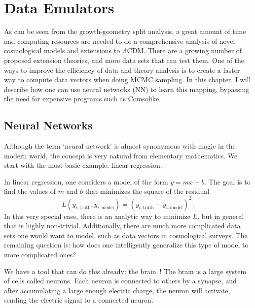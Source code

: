 \chapter{Data Emulators}
As can be seen from the growth-geometry split analysis, a great amount of time and computing resources are needed to do a comprehensive analysis of novel cosmological models and extensions to $\Lambda$CDM. There are a growing number of proposed extension theories, and more data sets that can test them. One of the ways to improve the efficiency of data and theory analysis is to create a faster way to compute data vectors when doing MCMC sampling. In this chapter, I will describe how one can use neural networks (NN) to learn this mapping, bypassing the need for expensive programs such as Comsolike.
\section{Neural Networks}
Although the term `neural network' is almost synonymous with magic in the modern world, the concept is very natural from elementary mathematics. We start with the most basic example: linear regression. 

In linear regression, one considers a model of the form $y=mx+b$. The goal is to find the values of $m$ and $b$ that minimizes the square of the residual
\begin{equation}
	L(y_{i,\mathrm{truth}},y_{i,\mathrm{model}}) = (y_{i,\mathrm{truth}} - y_{i,\mathrm{model}})^2\,.
\end{equation}
In this very special case, there is an analytic way to minimize $L$, but in general that is highly non-trivial. Additionally, there are much more complicated data sets one would want to model, such as data vectors in cosmological surveys. The remaining question is: how does one intelligently generalize this type of model to more complicated ones?

We have a tool that can do this already: the brain~\cite{noauthor_what_nodate}! The brain is a large system of cells called neurons. Each neuron is connected to others by a synapse, and after accumulating a large enough electric charge, the neuron will activate, sending the electric signal to a connected neuron. 

